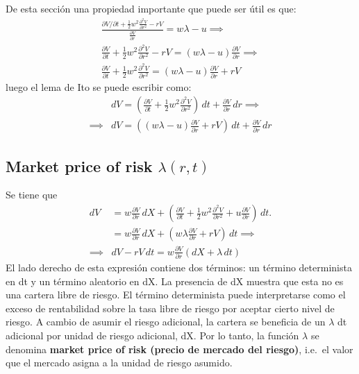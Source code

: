 De esta sección una propiedad importante que puede ser útil es que:
\begin{align*}
    \frac{\partial V/\partial t + \frac{1}{2} w^2 \frac{\partial^2 V}{\partial r^2} - rV}{\frac{\partial V}{\partial r}} = w\lambda - u \implies \\
    \frac{\partial V}{\partial t} + \frac{1}{2} w^2 \frac{\partial^2 V}{\partial r^2} - rV = (w\lambda - u) \frac{\partial V}{\partial r} \implies \\
    \frac{\partial V}{\partial t} + \frac{1}{2} w^2 \frac{\partial^2 V}{\partial r^2} = (w\lambda - u) \frac{\partial V}{\partial r} + rV
\end{align*}
luego el lema de Ito se puede escribir como:
\begin{align}
    &dV = \left(\frac{\partial V}{\partial t} + \frac{1}{2} w^2 \frac{\partial^2 V}{\partial r^2}\right)\,dt + \frac{\partial V}{\partial r}\,dr \implies \nonumber \\
    \implies &\boxed{dV = \left((w\lambda - u) \frac{\partial V}{\partial r} + rV\right)\,dt + \frac{\partial V}{\partial r}\,dr} \label{eq:variacion_bono}
\end{align}



\subsection{Market price of risk \texorpdfstring{$\lambda(r,t)$}{lambda(r,t)}}
Se tiene que
\begin{align*}
    dV &= w \frac{\partial V}{\partial r}\,dX + \left( \frac{\partial V}{\partial t} + \frac{1}{2} w^2 \frac{\partial^2 V}{\partial r^2} + u \frac{\partial V}{\partial r} \right)\,dt. \\
    &= w \frac{\partial V}{\partial r}\,dX + \left( w \lambda \frac{\partial V}{\partial r} + rV \right)\,dt \implies \\
    \implies &dV - rV\,dt = w \frac{\partial V}{\partial r} (dX + \lambda\,dt)
\end{align*}
El lado derecho de esta expresión contiene dos términos: un término determinista en dt y un término aleatorio en dX. La presencia de dX muestra que esta no es una cartera libre de riesgo. El término determinista puede interpretarse como el exceso de rentabilidad sobre la tasa libre de riesgo por aceptar cierto nivel de riesgo. A cambio de asumir el riesgo adicional, la cartera se beneficia de un $\lambda$ dt adicional por unidad de riesgo adicional, dX. Por lo tanto, la función $\lambda$ se denomina \textbf{market price of risk (precio de mercado del riesgo)}, i.e.\ el valor que el mercado asigna a la unidad de riesgo asumido.


